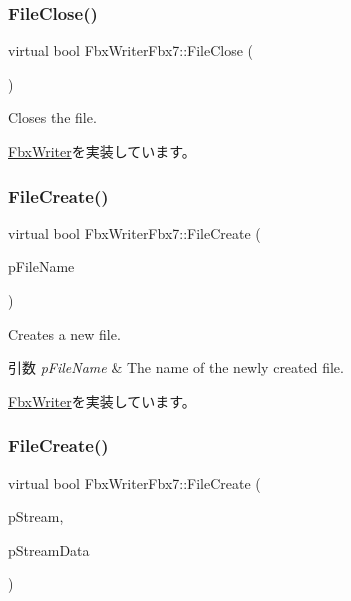 \subsubsection{\texorpdfstring{File\+Close()}{FileClose()}}
{\footnotesize\ttfamily virtual bool Fbx\+Writer\+Fbx7\+::\+File\+Close (\begin{DoxyParamCaption}{ }\end{DoxyParamCaption})\hspace{0.3cm}{\ttfamily [virtual]}}

Closes the file. 

\hyperlink{class_fbx_writer_a0387142f55d0020fd5360759c12aa121}{Fbx\+Writer}を実装しています。

\mbox{\label{class_fbx_writer_fbx7_ab76d4fdd92efb2a6506bde058bfde28e}} 
\subsubsection{\texorpdfstring{File\+Create()}{FileCreate()}\hspace{0.1cm}{\footnotesize\ttfamily [1/2]}}
{\footnotesize\ttfamily virtual bool Fbx\+Writer\+Fbx7\+::\+File\+Create (\begin{DoxyParamCaption}\item[{char $\ast$}]{p\+File\+Name }\end{DoxyParamCaption})\hspace{0.3cm}{\ttfamily [virtual]}}

Creates a new file. 
\begin{DoxyParams}{引数}
{\em p\+File\+Name} & The name of the newly created file. \\
\hline
\end{DoxyParams}


\hyperlink{class_fbx_writer_abe6729227cd6e3be5ee3ab0c1b8b0eda}{Fbx\+Writer}を実装しています。

\mbox{\label{class_fbx_writer_fbx7_a0e04e17fe0912786150b2728b76871bf}} 
\subsubsection{\texorpdfstring{File\+Create()}{FileCreate()}\hspace{0.1cm}{\footnotesize\ttfamily [2/2]}}
{\footnotesize\ttfamily virtual bool Fbx\+Writer\+Fbx7\+::\+File\+Create (\begin{DoxyParamCaption}\item[{\hyperlink{class_fbx_stream}{Fbx\+Stream} $\ast$}]{p\+Stream,  }\item[{void $\ast$}]{p\+Stream\+Data }\end{DoxyParamCaption})\hspace{0.3cm}{\ttfamily [virtual]}}

